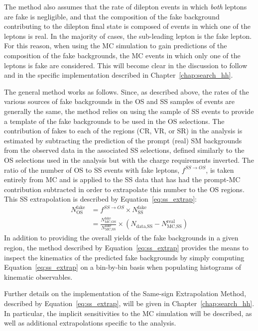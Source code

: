 The method also assumes that the rate of dilepton events in which \textit{both} leptons
are fake is negligible, and that the composition of the fake background contributing to
the dilepton final state is composed of events in which one of the leptons is real.
In the majority of cases, the sub-leading lepton is the fake lepton.
For this reason, when using the MC simulation to gain predictions of the composition of
the fake backgrounds, the MC events in which only one of the leptons is fake are considered.
This will become clear in the discussion to follow and in the specific implementation described
in Chapter~\ref{chap:search_hh}.


The general method works as follows.
Since, as described above, the rates of the various {\color{red}{just put "sources" not "rates"}} sources of fake backgrounds in the OS and SS samples of events
are generally the same, the method relies on using the sample of SS events to provide a template of the fake backgrounds
to be used in the OS selections.
The contribution of fakes to each of the regions (CR, VR, or SR) in the analysis is estimated
by subtracting the prediction of the prompt (real) SM backgrounds from the observed data
in the associated SS selections, defined similarly to the OS selections used in the analysis but with the
charge requirements inverted.
The ratio of the number of OS to SS events with fake leptons, $f^{SS \rightarrow OS}$,
is taken entirely from MC and is applied to the SS data that has had the prompt-MC contribution
subtracted in order to extrapolate this number to the OS regions.
This SS extrapolation is described by Equation~\ref{eq:ss_extrap}:
\begin{align}
    N_{\text{OS}}^{\text{fake}} &= f^{SS \rightarrow OS} \times N_{\text{SS}}^{\text{fake}} \nonumber \\
        &= \frac{ N_{\text{MC,OS}}^{\text{fake}} }{ N_{\text{MC,SS}}^{\text{fake}} } \times ( N_{\text{data,SS}} - N_{\text{MC,SS}}^{\text{real}} )
        \label{eq:ss_extrap}
\end{align}
In addition to providing the overall yields of the fake backgrounds in a given region,
the method described by Equation~\ref{eq:ss_extrap} provides the means to
inspect the kinematics of the predicted fake backgrounds by simply computing
Equation~\ref{eq:ss_extrap} on a bin-by-bin basis when populating histograms
of kinematic observables.

Further details on the implementation of the Same-sign Extrapolation Method,
described by Equation~\ref{eq:ss_extrap}, will be given in Chapter~\ref{chap:search_hh}.
In particular, the implicit sensitivities to the MC simulation will be described,
as well as additional extrapolations specific to the analysis.
